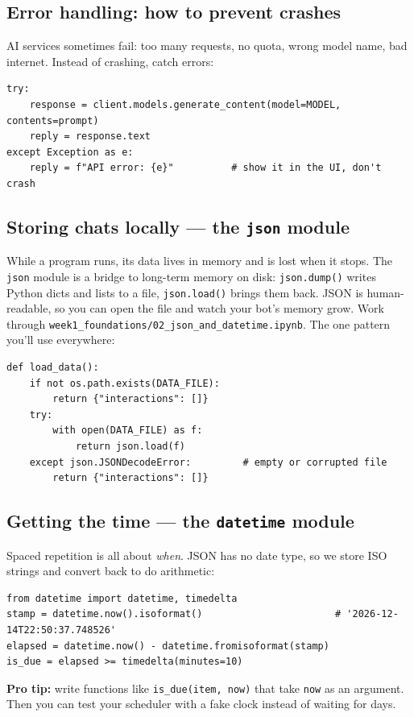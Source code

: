 \subsection{Error handling: how to prevent crashes}
AI services sometimes fail: too many requests, no quota, wrong model name, bad internet. Instead of crashing, catch errors:
\begin{lstlisting}
try:
    response = client.models.generate_content(model=MODEL, contents=prompt)
    reply = response.text
except Exception as e:
    reply = f"API error: {e}"          # show it in the UI, don't crash
\end{lstlisting}

\subsection{Storing chats locally --- the \texttt{json} module}
While a program runs, its data lives in memory and is lost when it stops. The \texttt{json} module is a bridge to
long-term memory on disk: \texttt{json.dump()} writes Python dicts and lists to a file, \texttt{json.load()} brings
them back. JSON is human-readable, so you can open the file and watch your bot's memory grow.
Work through \texttt{week1\_foundations/02\_json\_and\_datetime.ipynb}. The one pattern you'll use everywhere:
\begin{lstlisting}
def load_data():
    if not os.path.exists(DATA_FILE):
        return {"interactions": []}
    try:
        with open(DATA_FILE) as f:
            return json.load(f)
    except json.JSONDecodeError:         # empty or corrupted file
        return {"interactions": []}
\end{lstlisting}

\subsection{Getting the time --- the \texttt{datetime} module}
Spaced repetition is all about \emph{when}. JSON has no date type, so we store ISO strings and convert back to do arithmetic:
\begin{lstlisting}
from datetime import datetime, timedelta
stamp = datetime.now().isoformat()                       # '2026-12-14T22:50:37.748526'
elapsed = datetime.now() - datetime.fromisoformat(stamp)
is_due = elapsed >= timedelta(minutes=10)
\end{lstlisting}
\textbf{Pro tip:} write functions like \texttt{is\_due(item, now)} that take \texttt{now} as an argument. Then you can
test your scheduler with a fake clock instead of waiting for days.

